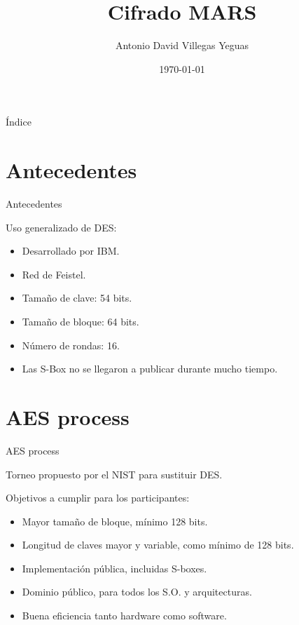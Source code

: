 \documentclass{beamer}
\title{Cifrado MARS}
\date{\today}
\author{Antonio David Villegas Yeguas}
\institute{Universidad de Granada\\
\medskip
\textit{advy99@correo.ugr.es}
\doclicenseThis
}
\begin{document}
 \maketitle

\begin{frame}{Índice}
\tableofcontents
\end{frame}




\section{Antecedentes}
\begin{frame}{Antecedentes}

	Uso generalizado de DES:

	\begin{itemize}
		\item Desarrollado por IBM.
		\item Red de Feistel.
		\item Tamaño de clave: 54 bits.
		\item Tamaño de bloque: 64 bits.
		\item Número de rondas: 16.
		\item Las S-Box no se llegaron a publicar durante mucho tiempo.
	\end{itemize}

\end{frame}


\section{AES process}
\begin{frame}{AES process}

	Torneo propuesto por el NIST para sustituir DES.

	Objetivos a cumplir para los participantes:

	\begin{itemize}
		\item Mayor tamaño de bloque, mínimo 128 bits.
		\item Longitud de claves mayor y variable, como mínimo de 128 bits.
		\item Implementación pública, incluidas S-boxes.
		\item Dominio público, para todos los S.O. y arquitecturas.
		\item Buena eficiencia tanto hardware como software.
	\end{itemize}

\end{frame}
\end{document}
